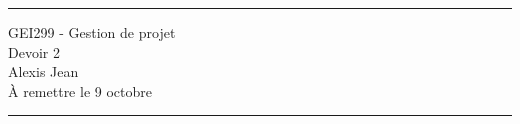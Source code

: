 \documentclass[11pt]{article}
\begin{document}
\hrule

\begin{center}
  {\Large GEI299 - Gestion de projet} \\ \vspace{5mm}
  {\LARGE\sffamily Devoir 2} \\
  Alexis Jean \\
  À remettre le 9 octobre
\end{center}

\hrule


\section{\underline{}}

\subsection{}
\end{document}
